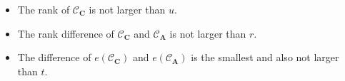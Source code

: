 \begin{itemize}[leftmargin=*]
    \item  The rank of $\mathcal{C}_\mathbf{C}$ is not larger than $u$.
    \item  The rank difference of $\mathcal{C}_\mathbf{C}$ and $\mathcal{C}_\mathbf{A}$ is not larger than $r$.  
    \item  The difference of $e(\mathcal{C}_\mathbf{C})$ and $e(\mathcal{C}_\mathbf{A})$ is the smallest and also not larger than $t$.
\end{itemize}


